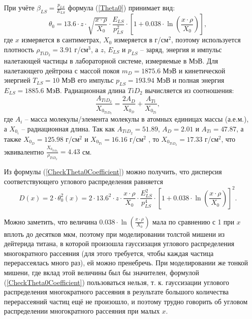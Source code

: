 \documentclass[a4paper,12pt]{article}
\begin{document}
\begin{large}
	При учёте $\beta_{LS}=\frac{p_{LS}}{E_{LS}}$ формула (\ref{Theta0}) принимает вид:
\begin{equation}
  \label{CheckTheta0Coefficient}
  \theta_0=13.6 \cdot z \cdot \sqrt{\frac{x\cdot \rho}{X_0}} \cdot \frac{E_{LS}}{p^2_{LS}} \cdot\left[ 1+0.038\cdot\ln\left(\frac{x\cdot \rho}{X_0}\right)\right],
\end{equation}
	где $x$ измеряется в сантиметрах, $X_0$ измеряется в г/см$^2$, поэтому используется плотность $\rho_{TiD_2}=3.91$ г/см$^3$, а $z$, $E_{LS}$ и $p_{LS}$ -- заряд, энергия и импульс налетающей частицы в лабораторной системе, измеряемые в МэВ.
	Для налетающего дейтрона с массой покоя $m_D=1875.6$ МэВ и кинетической энергией $T_{LS}=10$ МэВ его импульс $p_{LS}=193.94$ МэВ и полная энергия $E_{LS}=1885.6$ МэВ.
	Радиационная длина $TiD_2$ вычисляется из соотношения:
\begin{equation}
  \label{RadLength}
  \frac{A_{TiD_2}}{X_{0_{TiD_2}}}=\frac{2 A_{D}}{X_{0_{D}}}+\frac{A_{Ti}}{X_{0_{Ti}}},
\end{equation}
	где $A_i$ -- масса молекулы/элемента молекулы в атомных единицах массы (а.е.м.), а $X_{0_i}$ -- радиационная длина.
  	Так как $A_{TiD_2}=51.89$, $A_{D}=2.01$ и $A_{Ti}=47.87$, а также $X_{0_{D}}=125.98$ г/см$^2$ и $X_{0_{Ti}}=16.16$ г/см$^2$ \cite{PDG}, то $X_{0_{TiD_2}}=17.33$ г/см$^2$, что эквивалентно $\frac{X_{0_{TiD_2}}}{\rho_{TiD_2}}=4.43$ см.
  
  	Из формулы (\ref{CheckTheta0Coefficient}) можно получить, что дисперсия соответствующего углового распределения равняется
\begin{equation}
  \label{Theta0Dispersion}
   D(x)=2 \cdot \theta^2_0(x)=2 \cdot 13.6^2 \cdot z \cdot \frac{x\cdot \rho}{X_0} \cdot \frac{E^2_{LS}}{p^4_{LS}} \cdot\left[ 1+0.038\cdot\ln\left(\frac{x\cdot \rho}{X_0}\right)\right]^2.
\end{equation}  
  
  	Можно заметить, что величина $0.038\cdot\ln\left(\frac{x\cdot \rho}{X_0}\right)$ мала по сравнению с 1 при $x$ вплоть до десятков мкм, поэтому при моделировании толстой мишени из дейтерида титана, в которой произошла гауссизация углового распределения многократного рассеяния (для этого требуется, чтобы каждая частица перерассеялась много раз), ей можно пренебречь.
  	При моделировании же тонкой мишени, где вклад этой величины был бы значителен, формулой  (\ref{CheckTheta0Coefficient}) пользоваться нельзя, т. к. гауссизации углового распределения многократного рассеяния в результате большого количества перерассеяний частиц ещё не произошло, и поэтому трудно говорить об угловом распределении многократного рассеяния при малых $x$.
  

\end{large}
\end{document}
